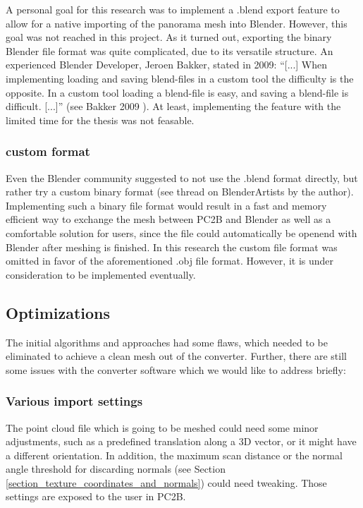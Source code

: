A personal goal for this research was to implement a .blend export feature to allow for a native importing of the panorama mesh into Blender. However, this goal was not reached in this project. As it turned out, exporting the binary Blender file format was quite complicated, due to its versatile structure. An experienced Blender Developer, Jeroen Bakker, stated in 2009: “[...] When implementing loading and saving blend-files in a custom tool the difficulty is the opposite. In a custom tool loading a blend-file is easy, and saving a blend-file is difficult. [...]” (see Bakker 2009 \parencite{webMysteryOfTheBlend}). At least, implementing the feature with the limited time for the thesis was not feasable.

\subsubsection{custom format}

Even the Blender community suggested to not use the .blend format directly, but rather try a custom binary format (see thread on BlenderArtists \parencite{webBlenderArtistsBlendExport} by the author). Implementing such a binary file format would result in a fast and memory efficient way to exchange the mesh between PC2B and Blender as well as a comfortable solution for users, since the file could automatically be openend with Blender after meshing is finished. In this research the custom file format was omitted in favor of the aforementioned .obj file format. However, it is under consideration to be implemented eventually.

\subsection{Optimizations}
\label{section_optimizations}

The initial algorithms and approaches had some flaws, which needed to be eliminated to achieve a clean mesh out of the converter. Further, there are still some issues with the converter software which we would like to address briefly:

\subsubsection{Various import settings}

The point cloud file which is going to be meshed could need some minor adjustments, such as a predefined translation along a 3D vector, or it might have a different orientation. In addition, the maximum scan distance or the normal angle threshold for discarding normals (see Section \ref{section_texture_coordinates_and_normals}) could need tweaking. Those settings are exposed to the user in PC2B.

